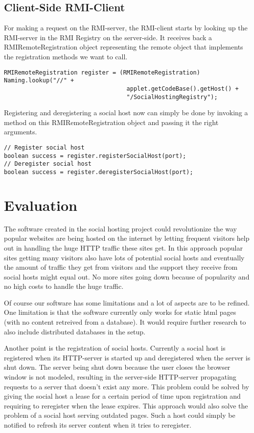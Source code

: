 \documentclass[a4paper, 10pt]{article}
\begin{document}
\subsection{Client-Side RMI-Client}
For making a request on the RMI-server, the RMI-client starts by looking up the RMI-server in the RMI Registry on the server-side. It receives back a RMIRemoteRegistration object representing the remote object that implements the registration methods we want to call.
\begin{lstlisting}
RMIRemoteRegistration register = (RMIRemoteRegistration) Naming.lookup("//" + 
                                   applet.getCodeBase().getHost() +
                                   "/SocialHostingRegistry");
\end{lstlisting}
Registering and deregistering a social host now can simply be done by invoking a method on this RMIRemoteRegistration object and passing it the right arguments.
\begin{lstlisting}
// Register social host
boolean success = register.registerSocialHost(port);
// Deregister social host
boolean success = register.deregisterSocialHost(port);
\end{lstlisting}

\section{Evaluation}

The software created in the social hosting project could revolutionize the way popular websites are being hosted on the internet by letting frequent visitors help out in handling the huge HTTP traffic these sites get. In this approach popular sites getting many visitors also have lots of potential social hosts and eventually the amount of traffic they get from visitors and the support they receive from social hosts might equal out. No more sites going down because of popularity and no high costs to handle the huge traffic.

Of course our software has some limitations and a lot of aspects are to be refined. One limitation is that the software currently only works for static html pages (with no content retreived from a database). It would require further research to also include distributed databases in the setup. 

Another point is the registration of social hosts. Currently a social host is registered when its HTTP-server is started up and deregistered when the server is shut down. The server being shut down because the user closes the browser window is not modeled, resulting in the server-side HTTP-server propagating requests to a server that doesn't exist any more. This problem could be solved by giving the social host a lease for a certain period of time upon registration and requiring to reregister when the lease expires. This approach would also solve the problem of a social host serving outdated pages. Such a host could simply be notified to refresh its server content when it tries to reregister.
\end{document}
